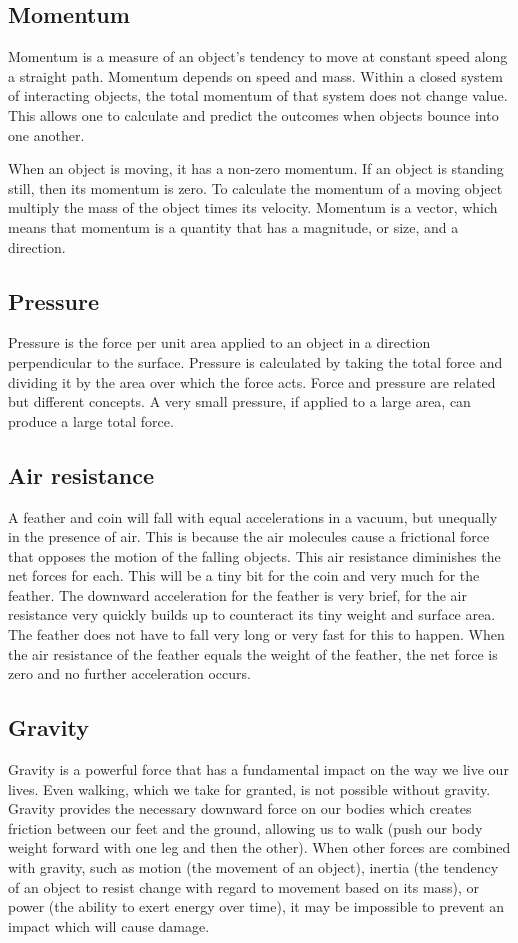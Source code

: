 \documentclass[hw]{exam}
\begin{document}
\subsection{Momentum}
Momentum is a measure of an object's tendency to move at constant speed along a straight path. Momentum depends on speed and mass. Within a closed system of interacting objects, the total momentum of that system does not change value. This allows one to calculate and predict the outcomes when objects bounce into one another.

When an object is moving, it has a non-zero momentum. If an object is standing still, then its momentum is zero. To calculate the momentum of a moving object multiply the mass of the object times its velocity. Momentum is a vector, which means that momentum is a quantity that has a magnitude, or size, and a direction.
 
\subsection{Pressure}
Pressure is the force per unit area applied to an object in a direction perpendicular to the surface. Pressure is calculated by taking the total force and dividing it by the area over which the force acts. Force and pressure are related but different concepts. A very small pressure, if applied to a large area, can produce a large total force.

\subsection{Air resistance}
A feather and coin will fall with equal accelerations in a vacuum, but unequally in the presence of air. This is because the air molecules cause a frictional force that opposes the motion of the falling objects. This air resistance diminishes the net forces for each. This will be a tiny bit for the coin and very much for the feather. The downward acceleration for the feather is very brief, for the air resistance very quickly builds up to counteract its tiny weight and surface area. The feather does not have to fall very long or very fast for this to happen. When the air resistance of the feather equals the weight of the feather, the net force is zero and no further acceleration occurs.

\subsection{Gravity}
Gravity is a powerful force that has a fundamental impact on the way we live our lives. Even walking, which we take for granted, is not possible without gravity. Gravity provides the necessary downward force on our bodies which creates friction between our feet and the ground, allowing us to walk (push our body weight forward with one leg and then the other).
When other forces are combined with gravity, such as motion (the movement of an object), inertia (the tendency of an object to resist change with regard to movement based on its mass), or power (the ability to exert energy over time), it may be impossible to prevent an impact which will cause damage.
\end{document}
